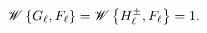 \[\mathop{\mathscr{W}\/}\nolimits\left\{\mathop{G_{\ell}\/}\nolimits,\mathop{F_{%
\ell}\/}\nolimits\right\}=\mathop{\mathscr{W}\/}\nolimits\left\{\mathop{{H^{%
\pm}_{\ell}}\/}\nolimits,\mathop{F_{\ell}\/}\nolimits\right\}=1.\]